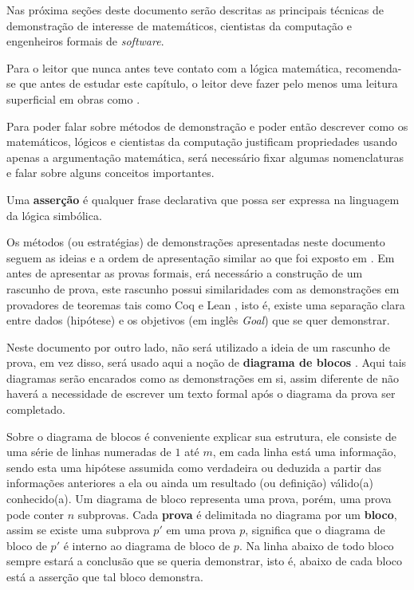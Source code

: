 Nas próxima seções deste documento serão descritas as principais técnicas de demonstração de interesse de matemáticos, cientistas da computação e engenheiros formais de \textit{software}.

\begin{atencao}
  Para o leitor que nunca antes teve contato com a lógica matemática, recomenda-se que antes de estudar este capítulo, o leitor deve fazer pelo menos uma leitura superficial em obras como \cite{edgar2002, leonidas2002, joaoPavao2014}. 
\end{atencao}

Para poder falar sobre métodos de demonstração e poder então descrever como os matemáticos, lógicos e cientistas da computação justificam propriedades usando apenas a argumentação matemática, será necessário fixar algumas nomenclaturas e falar sobre alguns conceitos importantes.

\begin{definicao}[Asserção]\label{def:Assercao}
	Uma \textbf{asserção} é qualquer frase declarativa que possa ser expressa na linguagem da lógica simbólica.
\end{definicao}

Os métodos (ou estratégias) de demonstrações apresentadas neste documento seguem as ideias e a ordem  de apresentação similar ao que foi exposto em \cite{velleman2019comProvar}. Em \cite{velleman2019comProvar} antes de apresentar as provas formais, erá necessário a construção de um rascunho de prova, este rascunho possui similaridades com as demonstrações em provadores de teoremas tais como Coq \cite{coq2013, softwarefoundations} e Lean \cite{lean2015}, isto é, existe uma separação clara entre dados (hipótese) e os objetivos (em inglês \textit{Goal}) que se quer demonstrar.

Neste documento por outro lado, não será utilizado a ideia de um rascunho de prova, em vez disso, será usado aqui a noção de \textbf{diagrama de blocos} \cite{broda2007}. Aqui tais diagramas serão encarados como as demonstrações em si, assim diferente de \cite{velleman2019comProvar} não haverá a necessidade de escrever um texto formal após o diagrama da prova ser completado.

Sobre o diagrama de blocos é conveniente explicar sua estrutura, ele consiste de uma série de linhas numeradas de $1$ até $m$, em cada linha está uma informação, sendo esta uma hipótese assumida como verdadeira ou deduzida a partir das informações anteriores a ela ou ainda um resultado (ou definição) válido(a) conhecido(a). Um diagrama de bloco representa uma prova, porém, uma prova pode conter $n$ subprovas. Cada \textbf{prova} é delimitada no diagrama por um \textbf{bloco}, assim se existe uma subprova $p'$ em uma prova $p$, significa que o diagrama de bloco de $p'$ é interno ao diagrama de bloco de $p$. Na linha abaixo de todo bloco sempre estará a conclusão que se queria demonstrar, isto é, abaixo de cada bloco está a asserção que tal bloco demonstra.

